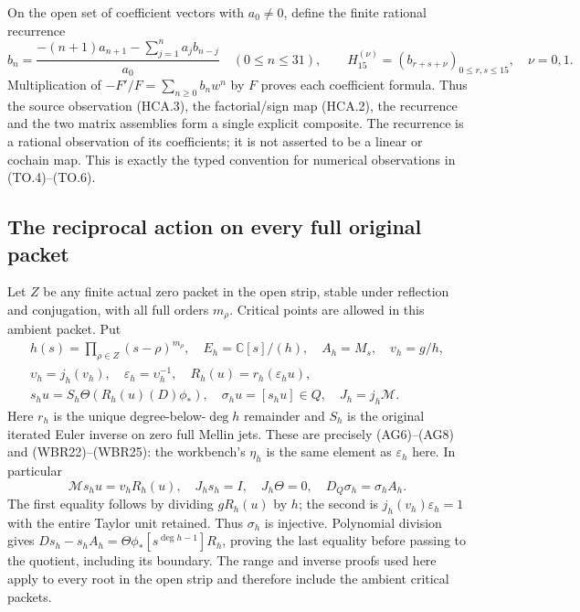 On the open set of coefficient vectors with $a_0\ne0$, define the
finite rational recurrence
\[
 b_n=\frac{-(n+1)a_{n+1}-\sum_{j=1}^na_jb_{n-j}}{a_0}
 \quad(0\leq n\leq31),\qquad
 H_{15}^{(\nu)}=(b_{r+s+\nu})_{0\leq r,s\leq15},\quad\nu=0,1.
 \tag{HCA.4}
\]
Multiplication of $-F'/F=\sum_{n\geq0}b_nw^n$ by $F$ proves
each coefficient formula. Thus the source observation (HCA.3),
the factorial/sign map (HCA.2), the recurrence and the two matrix
assemblies form a single explicit composite. The recurrence is a
rational observation of its coefficients; it is not asserted to
be a linear or cochain map. This is exactly the typed convention
for numerical observations in (TO.4)--(TO.6).

\subsection{The reciprocal action on every full original packet}

Let $Z$ be any finite actual zero packet in the open strip, stable
under reflection and conjugation, with all full orders $m_\rho$.
Critical points are allowed in this ambient packet. Put
\[
 \begin{gathered}
 h(s)=\prod_{\rho\in Z}(s-\rho)^{m_\rho},\quad
 E_h=\mathbb C[s]/(h),\quad A_h=M_s,\quad v_h=g/h,\\
 \upsilon_h=j_h(v_h),\quad\varepsilon_h=\upsilon_h^{-1},\quad
 R_h(u)=r_h(\varepsilon_hu),\\
 s_hu=S_h\Theta(R_h(u)(D)\phi_*),\quad
 \sigma_hu=[s_hu]\in Q,\quad J_h=j_h\mathcal M.
 \end{gathered}
 \tag{HCA.5}
\]
Here $r_h$ is the unique degree-below-$\deg h$ remainder and $S_h$
is the original iterated Euler inverse on zero full Mellin jets.
These are precisely (AG6)--(AG8) and (WBR22)--(WBR25): the
workbench's $\eta_h$ is the same element as $\varepsilon_h$ here.
In particular
\[
 \mathcal Ms_hu=v_hR_h(u),\quad J_hs_h=I,
 \quad J_h\Theta=0,\quad D_Q\sigma_h=\sigma_hA_h.
 \tag{HCA.6}
\]
The first equality follows by dividing $gR_h(u)$ by $h$; the
second is $j_h(v_h)\varepsilon_h=1$ with the entire Taylor unit
retained. Thus $\sigma_h$ is injective. Polynomial division gives
$Ds_h-s_hA_h=\Theta\phi_*[s^{\deg h-1}]R_h$, proving the
last equality before passing to the quotient, including its boundary.
The range and inverse proofs used here apply to every root in
the open strip and therefore include the ambient critical packets.

